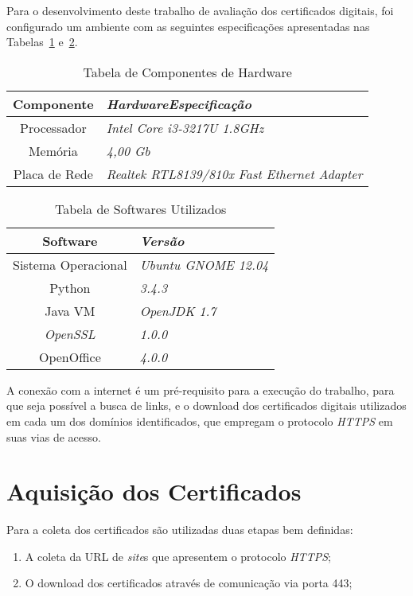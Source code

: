 		Para o desenvolvimento deste trabalho de avaliação dos certificados digitais, foi configurado um ambiente com as seguintes especificações apresentadas nas Tabelas~\ref{tab:hard} e~\ref{tab:soft}.
		\begin{table}[h]
			\centering
			\caption{Tabela de Componentes de Hardware}
			\label{tab:hard}
			\begin{tabular}{c>{\em}l}
			\toprule
			\textbf{Componente} & \textbf{Hardware\/Especificação} \\ \midrule
			Processador & Intel Core i3-3217U 1.8GHz \\ 
			\rowcolor[gray]{0.9}
			Memória & 4,00 Gb \\
			Placa de Rede & Realtek RTL8139/810x Fast Ethernet Adapter \\ 
			\bottomrule
			\end{tabular}
		\end{table}
		\begin{table}[h]
			\centering
			\caption{Tabela de Softwares Utilizados}
			\label{tab:soft}
			\begin{tabular}{c>{\em}l}
			\toprule
			\textbf{Software} & \textbf{Versão} \\ \midrule
			Sistema Operacional & Ubuntu GNOME 12.04 \\ 
			\rowcolor[gray]{0.9}
			Python & 3.4.3 \\
			Java VM & OpenJDK 1.7 \\
			\rowcolor[gray]{0.9}
			\textit{OpenSSL} & 1.0.0 \\
			OpenOffice & 4.0.0 \\
			\bottomrule
			\end{tabular}
		\end{table}
		A conexão com a internet é um pré-requisito para a execução do trabalho, para que seja possível a busca de links, e o download dos certificados digitais utilizados em cada um dos domínios identificados, que empregam o protocolo \textit{HTTPS} em suas vias de acesso. 
		
	\section[Aquisição dos Certificados]{Aquisição dos Certificados}
	
		Para a coleta dos certificados são utilizadas duas etapas bem definidas:
		
		\begin{enumerate}
			\item A coleta da URL de \textit{site}s que apresentem o protocolo \textit{HTTPS};
			\item O download dos certificados através de comunicação via porta 443;
		\end{enumerate}

